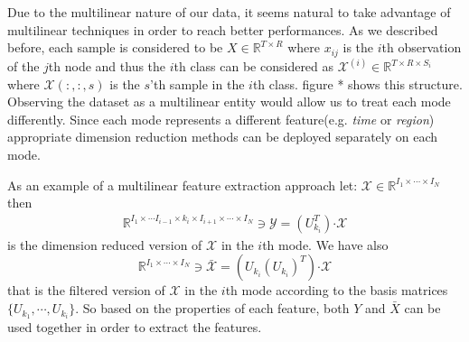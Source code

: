 \documentclass[journal]{IEEEtran}
\begin{document}
	Due to the multilinear nature of our data, it seems natural to take advantage of multilinear
	techniques in order to reach  better performances. As we described before, each sample is considered to be 
	$X \in \mathbb{R}^{T \times R}$ where $x_{ij}$ is the $i$th observation of the $j$th node and thus the $i$th class can be considered as 
	$\mathcal{X}^{(i)}\in \mathbb{R}^{T \times R \times S_i}$ where 
	$\mathcal{X}(:,:,s)$ is the $ s $'th sample in the $i$th class. figure * shows this structure.
	Observing the dataset as a multilinear entity would allow us to treat each mode differently. Since each mode represents a different feature(e.g. \textit{time} or \textit{region}) appropriate dimension reduction methods can be deployed separately on each mode. 
	
	As an example of a multilinear feature extraction approach let: $\mathcal{X} \in \mathbb{R}^{I_1\times \cdots \times I_N}$ then
	\begin{align}\label{dimention_reduction}
	\mathbb{R}^{I_1 \times \cdots I_{i-1}\times k_i \times I_{i+1} \times \cdots \times I_N} \ni
	\mathcal{Y}  = (U_{k_i}^T)\boldsymbol{\cdot} \mathcal{X} 
	\end{align}
	is the dimension reduced version of $\mathcal{X}$ in the $i$th mode. We have also 
	\[
	\mathbb{R}^{I_1 \times \cdots \times I_N}
	\ni
	\bar{\mathcal{X}} = \left( U^{}_{k_i} (U^{}_{k_i})^T \right) \boldsymbol{\cdot} \mathcal{X} 
	\]
	that is the filtered version of $\mathcal{X}$ in the $i$th mode according to the basis matrices $\{ U_{k_1},\cdots, U_{k_i} \}$.  So
	based on the properties of each feature, both $Y$ and $\bar{X}$ can be used together in order to extract the features. 
	
	
	
\end{document}
